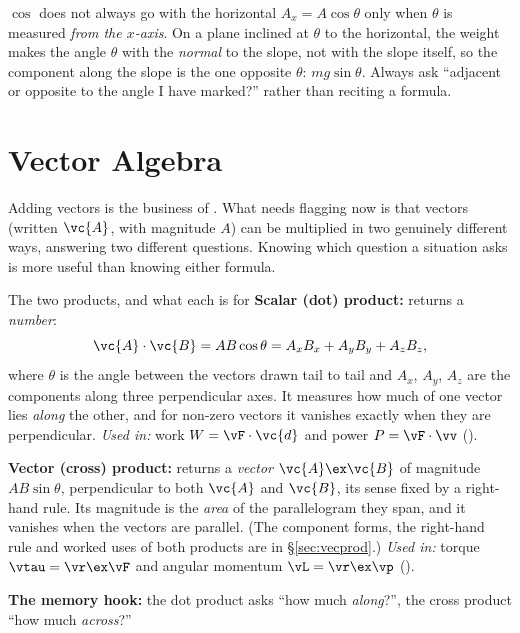 \begin{figure}[htbp]
\centering
{}
\end{figure}

\begin{trapbox}{$\cos$ does not always go with the horizontal}
$A_x=A\cos\theta$ only when $\theta$ is measured \emph{from the $x$-axis}. On a plane inclined at $\theta$
to the horizontal, the weight makes the angle $\theta$ with the \emph{normal} to the slope, not with the
slope itself, so the component along the slope is the one opposite $\theta$: $mg\sin\theta$. Always ask
``adjacent or opposite to the angle I have marked?'' rather than reciting a formula.
\end{trapbox}

\section{Vector Algebra}\label{sec:vecalg}

Adding vectors is the business of . What needs flagging now is that vectors (written
$\vc{A}$, with magnitude $A$) can be multiplied in two genuinely different ways, answering two different
questions. Knowing which question a situation asks is more useful than knowing either formula.

\begin{defbox}{The two products, and what each is for}
\textbf{Scalar (dot) product:} returns a \emph{number}:
\[
\vc{A}\cdot\vc{B}=AB\cos\theta=A_xB_x+A_yB_y+A_zB_z,
\]
where $\theta$ is the angle between the vectors drawn tail to tail and $A_x$, $A_y$, $A_z$ are the
components along three perpendicular axes. It measures how much of one vector lies \emph{along} the
other, and for non-zero vectors it vanishes exactly when they are perpendicular. \emph{Used in:} work $W=\vF\cdot\vc{d}$ and power $P=\vF\cdot\vv$ ().

\medskip
\textbf{Vector (cross) product:} returns a \emph{vector} $\vc{A}\ex\vc{B}$ of magnitude $AB\sin\theta$,
perpendicular to both $\vc{A}$ and $\vc{B}$, its sense fixed by a right-hand rule. Its magnitude is the
\emph{area} of the parallelogram they span, and it vanishes when the vectors are parallel. (The
component forms, the right-hand rule and worked uses of both products are in \S\ref{sec:vecprod}.) \emph{Used in:} torque $\vtau=\vr\ex\vF$ and angular
momentum $\vL=\vr\ex\vp$ ().

\medskip
\textbf{The memory hook:} the dot product asks ``how much \emph{along}?'', the cross product ``how much
\emph{across}?''
\end{defbox}

